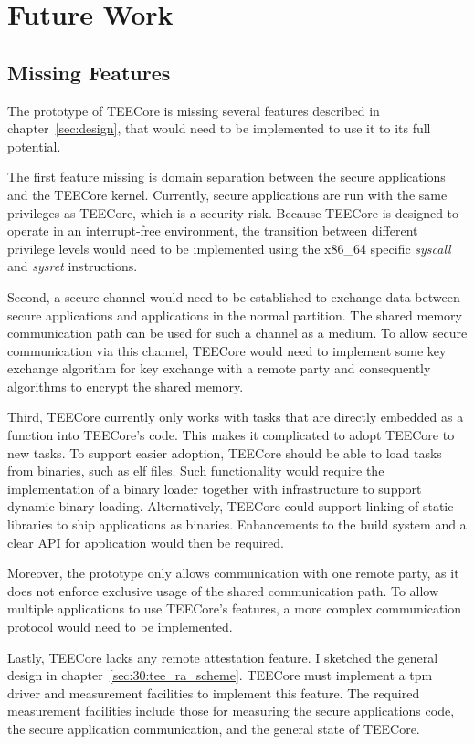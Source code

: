 \chapter{Future Work}
\label{sec:futurework}

\section{Missing Features}
The prototype of TEECore is missing several features described in
chapter~\ref{sec:design}, that would need to be implemented to use it to its
full potential.

The first feature missing is domain separation between the secure applications
and the TEECore kernel. Currently, secure applications are run with the same
privileges as TEECore, which is a security risk. Because TEECore is designed to
operate in an interrupt-free environment, the transition between different
privilege levels would need to be implemented using the x86\_64 specific
\textit{syscall} and \textit{sysret} instructions.

Second, a secure channel would need to be established to exchange data between
secure applications and applications in the normal partition. The shared memory
communication path can be used for such a channel as a medium. To allow secure
communication via this channel, TEECore would need to implement some key
exchange algorithm for key exchange with a remote party and consequently
algorithms to encrypt the shared memory.

Third, TEECore currently only works with tasks that are directly embedded as a
function into TEECore's code. This makes it complicated to adopt TEECore to new
tasks. To support easier adoption, TEECore should be able to load tasks from
binaries, such as \gls{elf} files. Such functionality would require the
implementation of a binary loader together with infrastructure to support
dynamic binary loading. Alternatively, TEECore could support linking of static
libraries to ship applications as binaries. Enhancements to the build system
and a clear API for application would then be required.

Moreover, the prototype only allows communication with one remote party, as it
does not enforce exclusive usage of the shared communication path. To allow
multiple applications to use TEECore's features, a more complex communication
protocol would need to be implemented.

Lastly, TEECore lacks any remote attestation feature. I sketched the general
design in chapter~\ref{sec:30:tee_ra_scheme}. TEECore must implement a \gls{tpm}
driver and measurement facilities to implement this feature. The required
measurement facilities include those for measuring the secure applications code,
the secure application communication, and the general state of TEECore.

